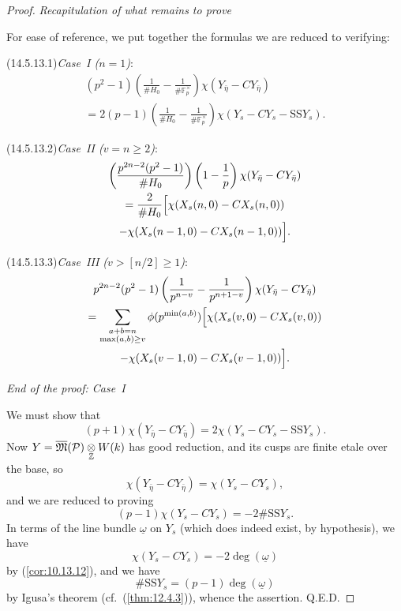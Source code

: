\begin{proof}
\kmitem\label{item:14.5.13} \emph{Recapitulation of what remains to prove}

For ease of reference, we put together the formulas we are reduced to verifying:

\par{}\noindent{}\label{item:14.5.13.1}(14.5.13.1)\enspace\emph{Case~I ($n = 1$)}:
\begin{multline*}
(p^2-1) \left( \frac{1}{\# H_0} - \frac{1}{\#\mathbb{F}_p^\times} \right) \chi(Y_{\bar{\eta}} - CY_{\bar{\eta}}) \\
= 2(p-1) \left( \frac{1}{\# H_0} - \frac{1}{\#\mathbb{F}_p^\times} \right) \chi(Y_s - CY_s - \mathrm{SS} Y_s) .
\end{multline*}

\par{}\noindent{}\label{item:14.5.13.2}(14.5.13.2)\enspace\emph{Case~II ($v = n \ge 2$)}:
\begin{multline*}
\left( \frac{p^{2n-2}(p^2-1)}{\# H_0} \right) \left( 1 - \frac{1}{p} \right) \chi(Y_{\bar{\eta}} - CY_{\bar{\eta}}) \\
= \frac{2}{\# H_0} \Bigl[ \chi(X_s(n,0) - CX_s(n,0)) \\
- \chi(X_s(n-1,0) - CX_s(n-1,0)) \Bigr] .
\end{multline*}

\par{}\noindent{}\label{item:14.5.13.3}(14.5.13.3)\enspace\emph{Case~III ($v > [n/2] \ge 1$)}:
\begin{multline*}
p^{2n-2}(p^2-1) \left( \frac{1}{p^{n-v}} - \frac{1}{p^{n+1-v}} \right) \chi(Y_{\bar{\eta}} - CY_{\bar{\eta}}) \\
= \sum_{\substack{a+b=n \\ \max(a,b) \ge v}} \phi(p^{\min(a,b)}) \Bigl[ \chi(X_s(v,0) - CX_s(v,0)) \\
- \chi(X_s(v-1,0) - CX_s(v-1,0)) \Bigr] .
\end{multline*}

\kmitem\label{item:14.5.14} \emph{End of the proof: Case~I}

We must show that
\[
(p+1) \chi(Y_{\bar{\eta}} - CY_{\bar{\eta}}) = 2 \chi(Y_s - CY_s - \mathrm{SS} Y_s) .
\]
Now $Y = \overline{\mathfrak{M}}(\mathcal{P}) \underset{\mathbb{Z}}{\otimes} W(k)$ has good reduction, and its cusps are finite etale over the base, so
\[
\chi(Y_{\bar{\eta}} - CY_{\bar{\eta}}) = \chi(Y_s - CY_s) ,
\]
and we are reduced to proving
\[
(p-1) \chi(Y_s - CY_s) = -2\#\mathrm{SS} Y_s .
\]
In terms of the line bundle $\underline{\omega}$ on $Y_s$ (which does indeed exist, by hypothesis), we have
\[
\chi(Y_s - CY_s) = -2 \deg(\underline{\omega})
\]
by (\ref{cor:10.13.12}), and we have
\[
\#\mathrm{SS} Y_s = (p-1) \deg(\underline{\omega})
\]
by Igusa's theorem (cf.~(\ref{thm:12.4.3})), whence the assertion. Q.E.D.


\end{proof}
